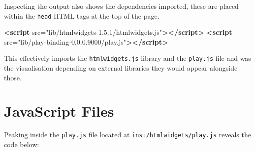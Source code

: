 \documentclass[
  10pt,
]{krantz}
\makeatletter
\newenvironment{Shaded}{\begin{snugshade}}{\end{snugshade}}
\newcommand{\KeywordTok}[1]{\textcolor[rgb]{0.27,0.27,0.27}{\textbf{#1}}}
\newcommand{\OtherTok}[1]{\textcolor[rgb]{0.37,0.37,0.37}{#1}}
\newcommand{\StringTok}[1]{\textcolor[rgb]{0.5,0.5,0.5}{#1}}
\newenvironment{kframe}{%
\medskip{}
\setlength{\fboxsep}{.8em}
 \def\at@end@of@kframe{}%
 \ifinner\ifhmode%
  \def\at@end@of@kframe{\end{minipage}}%
  \begin{minipage}{\columnwidth}%
 \fi\fi%
 \def\FrameCommand##1{\hskip\@totalleftmargin \hskip-\fboxsep
 \colorbox{shadecolor}{##1}\hskip-\fboxsep
     \hskip-\linewidth \hskip-\@totalleftmargin \hskip\columnwidth}%
 \MakeFramed {\advance\hsize-\width
   \@totalleftmargin\z@ \linewidth\hsize
   \@setminipage}}%
 {\par\unskip\endMakeFramed%
 \at@end@of@kframe}
\renewenvironment{Shaded}{\begin{kframe}}{\end{kframe}}
\makeatother
\begin{document}
Inspecting the output also shows the dependencies imported, these are placed within the \texttt{head} HTML tags at the top of the page.

\begin{Shaded}
\begin{Highlighting}[]
\KeywordTok{<script}\OtherTok{ src=}\StringTok{"lib/htmlwidgets{-}1.5.1/htmlwidgets.js"}\KeywordTok{></script>}
\KeywordTok{<script}\OtherTok{ src=}\StringTok{"lib/play{-}binding{-}0.0.0.9000/play.js"}\KeywordTok{></script>}
\end{Highlighting}
\end{Shaded}

This effectively imports the \texttt{htmlwidgets.js} library and the \texttt{play.js} file and was the visualisation depending on external libraries they would appear alongside those.

\hypertarget{widgets-first-js-files}{%
\section{JavaScript Files}\label{widgets-first-js-files}}

Peaking inside the \texttt{play.js} file located at \texttt{inst/htmlwidgets/play.js} reveals the code below:
\end{document}
